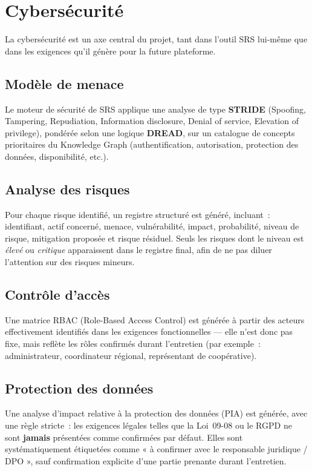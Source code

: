 \chapter{Cybersécurité}

La cybersécurité est un axe central du projet, tant dans l'outil SRS lui-même que dans
les exigences qu'il génère pour la future plateforme.

\section{Modèle de menace}
Le moteur de sécurité de SRS applique une analyse de type \textbf{STRIDE} (Spoofing,
Tampering, Repudiation, Information disclosure, Denial of service, Elevation of
privilege), pondérée selon une logique \textbf{DREAD}, sur un catalogue de concepts
prioritaires du Knowledge Graph (authentification, autorisation, protection des
données, disponibilité, etc.).

\section{Analyse des risques}
Pour chaque risque identifié, un registre structuré est généré, incluant~: identifiant,
actif concerné, menace, vulnérabilité, impact, probabilité, niveau de risque,
mitigation proposée et risque résiduel. Seuls les risques dont le niveau est
\emph{élevé} ou \emph{critique} apparaissent dans le registre final, afin de ne pas
diluer l'attention sur des risques mineurs.

\section{Contrôle d'accès}
Une matrice RBAC (Role-Based Access Control) est générée à partir des acteurs
effectivement identifiés dans les exigences fonctionnelles — elle n'est donc pas fixe,
mais reflète les rôles confirmés durant l'entretien (par exemple~: administrateur,
coordinateur régional, représentant de coopérative).

\section{Protection des données}
Une analyse d'impact relative à la protection des données (PIA) est générée, avec une
règle stricte~: les exigences légales telles que la Loi~09-08 ou le RGPD ne sont
\textbf{jamais} présentées comme confirmées par défaut. Elles sont systématiquement
étiquetées comme « à confirmer avec le responsable juridique / DPO », sauf confirmation
explicite d'une partie prenante durant l'entretien.

